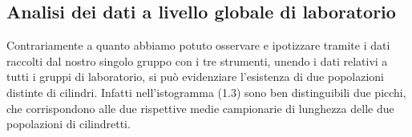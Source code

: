 \subsection{Analisi dei dati a livello globale di laboratorio}
Contrariamente a quanto abbiamo potuto osservare e ipotizzare tramite i dati
raccolti dal nostro singolo gruppo con i tre strumenti, unendo i dati relativi
a tutti i gruppi di laboratorio, si può evidenziare l'esistenza di due popolazioni
distinte di cilindri. Infatti nell'istogramma (1.3) sono ben distinguibili due picchi,
che corrispondono alle due rispettive medie campionarie di lunghezza delle due
popolazioni di cilindretti.

